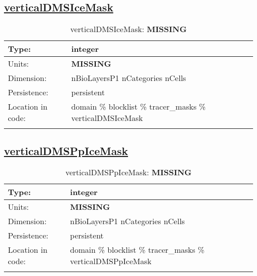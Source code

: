 \subsection[verticalDMSIceMask]{\hyperref[sec:var_tab_tracer_masks]{verticalDMSIceMask}}
\label{subsec:var_sec_tracer_masks_verticalDMSIceMask}
\begin{center}
\begin{longtable}{| p{2.0in} | p{4.0in} |}
        \hline 
        Type: & integer \\
        \hline 
        Units: & {\bf \color{red} MISSING} \\
        \hline 
        Dimension: & nBioLayersP1 nCategories nCells \\
        \hline 
        Persistence: & persistent \\
        \hline 
         Location in code: & domain \% blocklist \% tracer\_masks \% verticalDMSIceMask \\
         \hline 
    \caption{verticalDMSIceMask: {\bf \color{red} MISSING}}
\end{longtable}
\end{center}
\subsection[verticalDMSPpIceMask]{\hyperref[sec:var_tab_tracer_masks]{verticalDMSPpIceMask}}
\label{subsec:var_sec_tracer_masks_verticalDMSPpIceMask}
\begin{center}
\begin{longtable}{| p{2.0in} | p{4.0in} |}
        \hline 
        Type: & integer \\
        \hline 
        Units: & {\bf \color{red} MISSING} \\
        \hline 
        Dimension: & nBioLayersP1 nCategories nCells \\
        \hline 
        Persistence: & persistent \\
        \hline 
         Location in code: & domain \% blocklist \% tracer\_masks \% verticalDMSPpIceMask \\
         \hline 
    \caption{verticalDMSPpIceMask: {\bf \color{red} MISSING}}
\end{longtable}
\end{center}
